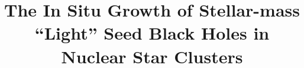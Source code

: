 \documentclass[twocolumn]{aastex631}
\begin{document}
\title{The In Situ Growth of Stellar-mass ``Light'' Seed Black Holes in Nuclear Star Clusters}


\end{document}
